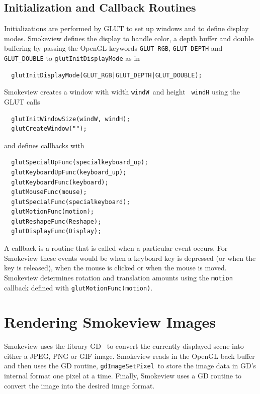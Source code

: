 \documentclass[11pt,twoside]{book}
\begin{document}
\section{Initialization and Callback Routines}
Initializations are performed by GLUT to set up windows and to
define display modes.  Smokeview defines the display to handle
color, a depth buffer and double buffering by passing the OpenGL
keywords {\tt GLUT\_RGB}, {\tt GLUT\_DEPTH} and {\tt GLUT\_DOUBLE}
to {\tt glutInitDisplayMode} as in

\begin{verbatim}
  glutInitDisplayMode(GLUT_RGB|GLUT_DEPTH|GLUT_DOUBLE);
\end{verbatim}

Smokeview creates a window with width {\tt windW}\ and height {\tt
windH} using the GLUT calls

\begin{verbatim}
  glutInitWindowSize(windW, windH);
  glutCreateWindow("");
\end{verbatim}

and defines callbacks with

\begin{verbatim}
  glutSpecialUpFunc(specialkeyboard_up);
  glutKeyboardUpFunc(keyboard_up);
  glutKeyboardFunc(keyboard);
  glutMouseFunc(mouse);
  glutSpecialFunc(specialkeyboard);
  glutMotionFunc(motion);
  glutReshapeFunc(Reshape);
  glutDisplayFunc(Display);
\end{verbatim}

A callback is a routine that is called when a particular event
occurs.  For Smokeview these events would be when a keyboard key
is depressed (or when the key is released), when the mouse is
clicked or when the mouse is moved.  Smokeview determines rotation
and translation amounts using the {\tt motion} callback defined
with {\tt glutMotionFunc(motion)}.




%
%

\chapter{Rendering Smokeview Images}

Smokeview uses the library GD~\cite{GDLIB} to convert the currently displayed scene into either a JPEG, PNG or GIF image.  Smokeview reads in the OpenGL back buffer and then uses the GD routine, {\tt gdImageSetPixel}\ to store the image data in GD's internal format one pixel at a time.    Finally, Smokeview uses a GD routine to convert the image into the desired image format.
\end{document}
